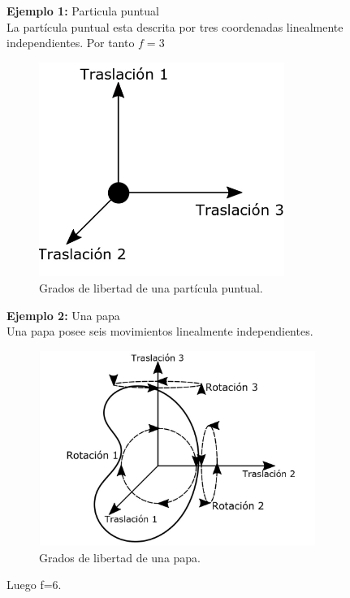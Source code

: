 \documentclass[12pt]{report}
\begin{document}
\textbf{Ejemplo 1:} Particula puntual \\

La partícula puntual esta descrita por tres coordenadas linealmente independientes. Por tanto $f=3$ \\


\begin{figure}[H]
	\begin{center}
	\includegraphics[width=8cm]{figura18.png} 
	\caption{ Grados de libertad de una partícula puntual.}
	\label{fig.1}
	\end{center}
\end{figure}

\textbf{Ejemplo 2:} Una papa 
\\

Una papa posee seis movimientos linealmente independientes.
 
\begin{figure}[H]
	\begin{center}
	\includegraphics[width=9cm]{figura19.jpeg} 
	\caption{ Grados de libertad de una papa.}
	\label{fig.1}
	\end{center}
\end{figure}

 Luego f=6. \\   
\end{document}
